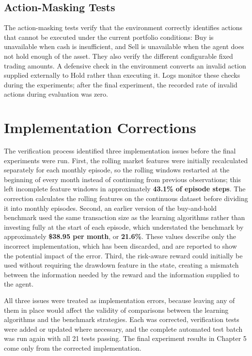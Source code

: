 \subsection{Action-Masking Tests}

The action-masking tests verify that the environment correctly
identifies actions that cannot be executed under the current portfolio
conditions: Buy is unavailable when cash is insufficient, and Sell is
unavailable when the agent does not hold enough of the asset. They also
verify the different configurable fixed trading amounts. A defensive
check in the environment converts an invalid action supplied externally
to Hold rather than executing it. Logs monitor these checks during the
experiments; after the final experiment, the recorded rate of invalid
actions during evaluation was zero.

\section{Implementation Corrections}

The verification process identified three implementation issues before
the final experiments were run. First, the rolling market features were
initially recalculated separately for each monthly episode, so the
rolling windows restarted at the beginning of every month instead of
continuing from previous observations; this left incomplete feature
windows in approximately \textbf{43.1\% of episode steps}. The
correction calculates the rolling features on the continuous dataset
before dividing it into monthly episodes. Second, an earlier version of
the buy-and-hold benchmark used the same transaction size as the
learning algorithms rather than investing fully at the start of each
episode, which understated the benchmark by approximately \textbf{\$38.95
per month}, or \textbf{21.6\%}. These values describe only the incorrect
implementation, which has been discarded, and are reported to show the
potential impact of the error. Third, the risk-aware reward could
initially be used without requiring the drawdown feature in the state,
creating a mismatch between the information needed by the reward and the
information supplied to the agent.

All three issues were treated as implementation errors, because leaving
any of them in place would affect the validity of comparisons between
the learning algorithms and the benchmark strategies. Each was corrected,
verification tests were added or updated where necessary, and the
complete automated test batch was run again with all 21 tests passing.
The final experiment results in Chapter 5 come only from the corrected
implementation.

